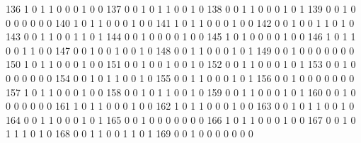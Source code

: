 \documentclass[compress,8pt]{beamer}
\begin{document}
\begin{frame}
\begin{Schunk}
  136      1       0   1              1        0    0       0       1   0   0
  137      0       0   1              0        1    1       0       0   1   0
  138      0       0   1              1        0    0       0       1   0   1
  139      0       0   1              0        0    0       0       0   0   0
  140      1       0   1              1        0    0       0       1   0   0
  141      1       0   1              1        0    0       0       1   0   0
  142      0       0   1              0        0    1       1       0   1   0
  143      0       0   1              1        0    0       1       1   0   1
  144      0       0   1              0        0    0       0       1   0   0
  145      1       0   1              0        0    0       0       1   0   0
  146      1       0   1              1        0    0       1       1   0   0
  147      0       0   1              0        0    1       0       0   1   0
  148      0       0   1              1        0    0       0       1   0   1
  149      0       0   1              0        0    0       0       0   0   0
  150      1       0   1              1        0    0       0       1   0   0
  151      0       0   1              0        0    1       0       0   1   0
  152      0       0   1              1        0    0       0       1   0   1
  153      0       0   1              0        0    0       0       0   0   0
  154      0       0   1              0        1    1       0       0   1   0
  155      0       0   1              1        0    0       0       1   0   1
  156      0       0   1              0        0    0       0       0   0   0
  157      1       0   1              1        0    0       0       1   0   0
  158      0       0   1              0        1    1       0       0   1   0
  159      0       0   1              1        0    0       0       1   0   1
  160      0       0   1              0        0    0       0       0   0   0
  161      1       0   1              1        0    0       0       1   0   0
  162      1       0   1              1        0    0       0       1   0   0
  163      0       0   1              0        1    1       0       0   1   0
  164      0       0   1              1        0    0       0       1   0   1
  165      0       0   1              0        0    0       0       0   0   0
  166      1       0   1              1        0    0       0       1   0   0
  167      0       0   1              0        1    1       1       0   1   0
  168      0       0   1              1        0    0       1       1   0   1
  169      0       0   1              0        0    0       0       0   0   0

\end{Schunk}
\end{frame}
\end{document}

